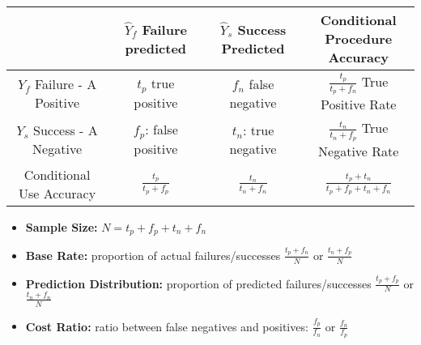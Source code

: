 \label{sec:appendix}

\begin{center}
    \begin{tabular}{ |c|c|c|c| } 
    \hline
      & \thead{$\hat{Y}_f$ \\ Failure predicted} & \thead{$\hat{Y}_s$ \\ Success Predicted} & \thead{Conditional Procedure \\ Accuracy} \\ 
    \hline
    \thead{$Y_f$ \\ Failure - A Positive} & \makecell{$t_p$ \\ true positive} & \makecell{$f_n$ \\ false negative} & \makecell{$\frac{t_p}{t_p + f_n}$ \\ True Positive Rate} \\ 
    \hline
    \thead{$Y_s$ \\ Success - A Negative} & $f_p$: false positive & $t_n$: true negative & \makecell{$\frac{t_n}{t_n + f_p}$ \\ True Negative Rate } \\ 
    \hline
    \thead{Conditional \\ Use Accuracy} & $\frac{t_p}{t_p + f_p}$ & $\frac{t_n}{t_n + f_n}$ & $\frac{t_p + t_n}{t_p + f_p + t_n + f_n}$ \\ 
    \hline
    \end{tabular}
    \label{tab:confusion}
\end{center}

\begin{itemize}
    \item \textbf{Sample Size:} $N = t_p + f_p + t_n + f_n$
    \item \textbf{Base Rate:} proportion of actual failures/successes $\frac{t_p + f_n}{N}$ or $\frac{t_n + f_p}{N}$
    \item \textbf{Prediction Distribution:} proportion of predicted failures/successes $\frac{t_p + f_p}{N}$ or $\frac{t_n + f_n}{N}$
    \item \textbf{Cost Ratio:} ratio between false negatives and positives: $\frac{f_p}{f_n}$ or $\frac{f_n}{f_p}$
\end{itemize}